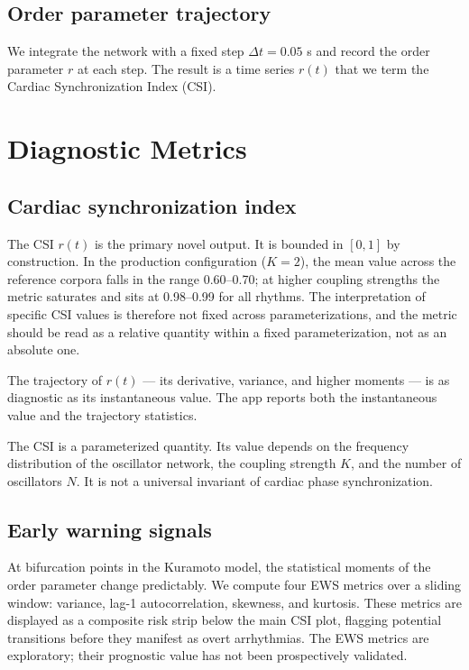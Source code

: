 \documentclass[11pt]{article}
\begin{document}
\subsection{Order parameter trajectory}

We integrate the network with a fixed step $\Delta t = 0.05$ s and
record the order parameter $r$ at each step. The result is a time
series $r(t)$ that we term the Cardiac Synchronization Index (CSI).

\section{Diagnostic Metrics}\label{sec:metrics}

\subsection{Cardiac synchronization index}

The CSI $r(t)$ is the primary novel output. It is bounded in $[0,1]$ by
construction. In the production configuration ($K = 2$), the mean value
across the reference corpora falls in the range 0.60--0.70; at higher
coupling strengths the metric saturates and sits at 0.98--0.99 for all
rhythms. The interpretation of specific CSI values is therefore not
fixed across parameterizations, and the metric should be read as a
relative quantity within a fixed parameterization, not as an absolute
one.

The trajectory of $r(t)$ --- its derivative, variance, and higher
moments --- is as diagnostic as its instantaneous value. The app
reports both the instantaneous value and the trajectory statistics.

The CSI is a parameterized quantity. Its value depends on the frequency
distribution of the oscillator network, the coupling strength $K$, and
the number of oscillators $N$. It is not a universal invariant of
cardiac phase synchronization.

\subsection{Early warning signals}

At bifurcation points in the Kuramoto model, the statistical moments of
the order parameter change predictably. We compute four EWS metrics
over a sliding window: variance, lag-1 autocorrelation, skewness, and
kurtosis. These metrics are displayed as a composite risk strip below
the main CSI plot, flagging potential transitions before they manifest
as overt arrhythmias. The EWS metrics are exploratory; their prognostic
value has not been prospectively validated.
\end{document}

